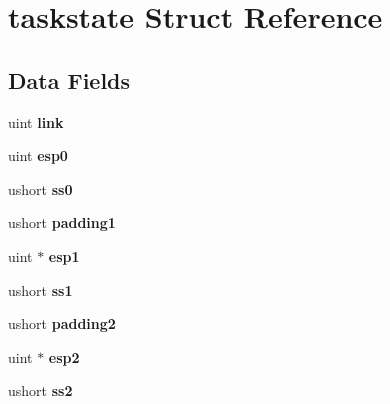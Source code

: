 \hypertarget{structtaskstate}{}\section{taskstate Struct Reference}
\label{structtaskstate}
\subsection*{Data Fields}
\begin{DoxyCompactItemize}
\item 
uint {\bfseries link}\hypertarget{structtaskstate_a31a48a737b004273004ba8473ab6b0ed}{}\label{structtaskstate_a31a48a737b004273004ba8473ab6b0ed}

\item 
uint {\bfseries esp0}\hypertarget{structtaskstate_a41b3e1d46a5068485eb6714974a979d6}{}\label{structtaskstate_a41b3e1d46a5068485eb6714974a979d6}

\item 
ushort {\bfseries ss0}\hypertarget{structtaskstate_a574e97ea3fd87f314da88afec3c6f574}{}\label{structtaskstate_a574e97ea3fd87f314da88afec3c6f574}

\item 
ushort {\bfseries padding1}\hypertarget{structtaskstate_a6b87ceb039ec11ccd265818673c53df5}{}\label{structtaskstate_a6b87ceb039ec11ccd265818673c53df5}

\item 
uint $\ast$ {\bfseries esp1}\hypertarget{structtaskstate_a7ec69acf5f95163bd1ca2548fb0c541a}{}\label{structtaskstate_a7ec69acf5f95163bd1ca2548fb0c541a}

\item 
ushort {\bfseries ss1}\hypertarget{structtaskstate_ac70c36414956cfee04c733a5b530d8ef}{}\label{structtaskstate_ac70c36414956cfee04c733a5b530d8ef}

\item 
ushort {\bfseries padding2}\hypertarget{structtaskstate_ae1bd6ae664d5899c3e118c21a27ba065}{}\label{structtaskstate_ae1bd6ae664d5899c3e118c21a27ba065}

\item 
uint $\ast$ {\bfseries esp2}\hypertarget{structtaskstate_af206a117571ede3752b043e4e8cc6016}{}\label{structtaskstate_af206a117571ede3752b043e4e8cc6016}

\item 
ushort {\bfseries ss2}\hypertarget{structtaskstate_a573d8f57ef11630e782d8b7c924f28ce}{}\label{structtaskstate_a573d8f57ef11630e782d8b7c924f28ce}


\end{DoxyCompactItemize}
